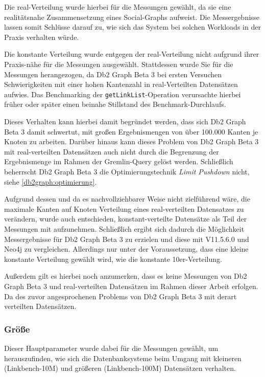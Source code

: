 Die real-Verteilung wurde hierbei für die Messungen gewählt, da sie eine realitätsnahe Zusammensetzung eines Social-Graphs aufweist. Die Messergebnisse lassen somit Schlüsse darauf zu, wie sich das System bei solchen Workloads in der Praxis verhalten würde.

Die konstante Verteilung wurde entgegen der real-Verteilung nicht aufgrund ihrer Praxis-nähe für die Messungen ausgewählt. Stattdessen wurde Sie für die Messungen herangezogen, da Db2 Graph Beta 3 bei ersten Versuchen Schwierigkeiten mit einer hohen Kantenzahl in real-Verteilten Datensätzen aufwies. Das Benchmarking der \texttt{getLinkList}-Operation verursachte hierbei früher oder später einen beinahe Stillstand des Benchmark-Durchlaufs. 

Dieses Verhalten kann hierbei damit begründet werden, dass sich Db2 Graph Beta 3 damit schwertut, mit großen Ergebnismengen von über 100.000 Kanten je Knoten zu arbeiten. Darüber hinaus kann dieses Problem von Db2 Graph Beta 3 mit real-verteilten Datensätzen auch nicht durch die Begrenzung der Ergebnismenge im Rahmen der Gremlin-Query gelöst werden. Schließlich beherrscht Db2 Graph Beta 3 die Optimierungstechnik \textit{Limit Pushdown} nicht, siehe \autoref{db2graph:optimierung}. 

Aufgrund dessen und da es nachvollziehbarer Weise nicht zielführend wäre, die maximale Kanten auf Knoten Verteilung eines real-verteilten Datensatzes zu verändern, wurde auch entschieden, konstant-verteilte Datensätze als Teil der Messungen mit aufzunehmen. Schließlich ergibt sich dadurch die Möglichkeit Messergebnisse für Db2 Graph Beta 3 zu erzielen und diese mit V11.5.6.0 und Neo4j zu vergleichen. Allerdings nur unter der Voraussetzung, dass eine kleine konstante Verteilung gewählt wird, wie die konstante 10er-Verteilung. 

Außerdem gilt es hierbei noch anzumerken, dass es keine Messungen von Db2 Graph Beta 3 und real-verteilten Datensätzen im Rahmen dieser Arbeit erfolgen. Da des zuvor angesprochenen Problems von Db2 Graph Beta 3 mit derart verteilten Datensätzen.

\subsubsection{Größe}
Dieser Hauptparameter wurde dabei für die Messungen gewählt, um herauszufinden, wie sich die Datenbanksysteme beim Umgang mit kleineren (Linkbench-10M) und größeren (Linkbench-100M) Datensätzen verhalten. 

